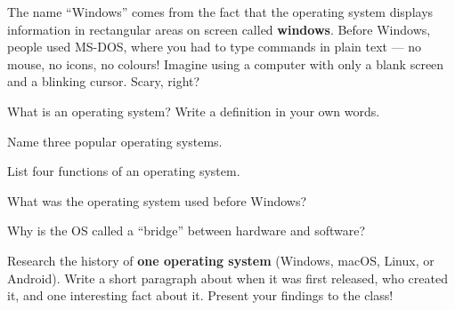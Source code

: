 
\begin{funfact}
The name ``Windows'' comes from the fact that the operating system displays information in rectangular areas on screen called \textbf{windows}. Before Windows, people used MS-DOS, where you had to type commands in plain text --- no mouse, no icons, no colours! Imagine using a computer with only a blank screen and a blinking cursor. Scary, right?
\end{funfact}


\begin{reviewqs}
  \item What is an operating system? Write a definition in your own words.
  \item Name three popular operating systems.
  \item List four functions of an operating system.
  \item What was the operating system used before Windows?
  \item Why is the OS called a ``bridge'' between hardware and software?
\end{reviewqs}

\begin{challenge}
Research the history of \textbf{one operating system} (Windows, macOS, Linux, or Android). Write a short paragraph about when it was first released, who created it, and one interesting fact about it. Present your findings to the class!
\end{challenge}

